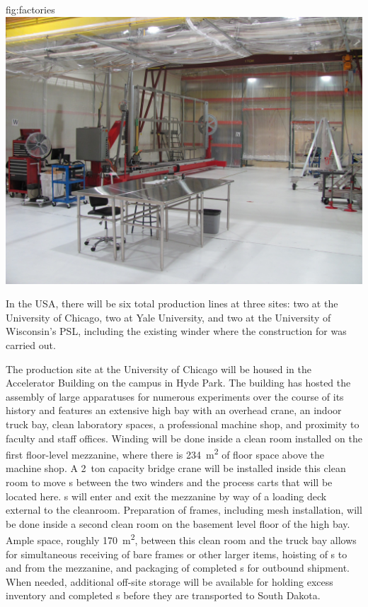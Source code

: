 \begin{dunefigure}{fig:factories}
\includegraphics[height=0.225\textheight]{graphics/sp-apa-factory-psl.jpg} 
\end{dunefigure}

In the USA, there will be six total production lines at three sites: two at the University of Chicago, two at Yale University, and two at the University of Wisconsin's PSL, including the existing winder where the construction for  was carried out. 

The  production site at the University of Chicago will be housed in the Accelerator Building on the campus in Hyde Park.  The building has hosted the assembly of large apparatuses for numerous experiments over the course of its history and features an extensive high bay with an overhead crane, an indoor truck bay, clean laboratory spaces, a professional machine shop, and proximity to faculty and staff offices.  Winding will be done inside a clean room installed on the first floor-level mezzanine, where there is \SI{234}{m^2} of floor space above the machine shop.  A \SI{2}{ton} capacity bridge crane will be installed inside this clean room to move s %
between the two winders and the process carts that will be located here.  s will enter and exit the mezzanine by way of a loading deck external to the cleanroom.  Preparation of  frames, including mesh installation, will be done inside a second clean room on the basement level floor of the high bay.  Ample space, roughly \SI{170}{m^2}, between this clean room and the truck bay allows for simultaneous receiving of bare frames or other larger items, hoisting of s to and from the mezzanine, and packaging of completed s for outbound shipment.  When needed, additional off-site storage will be available for holding excess inventory and completed s before they are transported to South Dakota.

